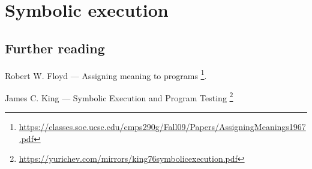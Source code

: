 \section{Symbolic execution}




\subsection{Further reading}

Robert W. Floyd --- Assigning meaning to programs
\footnote{\url{https://classes.soe.ucsc.edu/cmps290g/Fall09/Papers/AssigningMeanings1967.pdf}}.

James C. King --- Symbolic Execution and Program Testing
\footnote{\url{https://yurichev.com/mirrors/king76symbolicexecution.pdf}}

